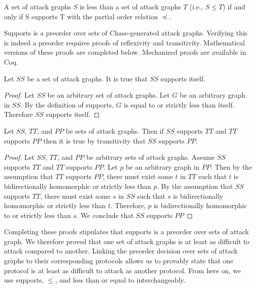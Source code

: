 \documentclass[runningheads]{llncs}
\theoremstyle{definition}
\begin{document}
\begin{definition}
  A set of attack graphs $S$ is less than a set of attack graphs $T$ (i.e., $S \leq T$) if and only if S supports T with the partial order relation $\preceq$.
\end{definition}


\noindent Supports is a preorder over sets of Chase-generated attack graphs. Verifying this is indeed a preorder requires proofs of reflexivity and transitivity. Mathematical versions of these proofs are completed below. Mechanized proofs are available in Coq.  

\begin{theorem}
    Let $SS$ be a set of attack graphs. It is true that $SS$ supports itself.
\end{theorem}
\begin{proof}    
    Let $SS$ be an arbitrary set of attack graphs. Let $G$ be an arbitrary graph in $SS$. By the definition of supports, $G$ is equal to or strictly less than itself. Therefore $SS$ supports itself. 
\end{proof}

\begin{theorem}
    Let $SS$, $TT$, and $PP$ be sets of attack graphs. Then if $SS$ supports $TT$ and $TT$ supports $PP$ then it is true by transitivity that $SS$ supports $PP$. 
\end{theorem}
\begin{proof}
    Let $SS$, $TT$, and $PP$ be arbitrary sets of attack graphs. Assume $SS$ supports $TT$ and $TT$ supports $PP$. Let $p$ be an arbitrary graph in $PP$. Then by the assumption that $TT$ supports $PP$, there must exist some $t$ in $TT$ such that $t$ is bidirectionally homomorphic or strictly less than $p$. By the assumption that $SS$ supports $TT$, there must exist some $s$ in $SS$ such that $s$ is bidirectionally homomorphic or strictly less than $t$. Therefore, $p$ is bidirectionally homomorphic to or strictly less than $s$. We conclude that $SS$ supports $PP$
\end{proof}

\noindent Completing these proofs stipulates that supports is a preorder over sets of attack graph. We therefore proved that one set of attack graphs is at least as difficult to attack compared to another. Linking the preorder decision over sets of attack graphs to their corresponding protocols allows us to provably state that one protocol is at least as difficult to attack as another protocol. From here on, we use supports, $\leq$, and less than or equal to interchangeably. 
\end{document}
